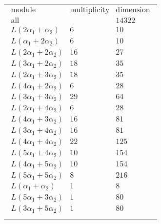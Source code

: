 \documentclass[crop,border=2mm]{standalone}
\begin{document}
\begin{tabular}{l}
$\displaystyle
\begin{array}{rll}
	\text{module}&\text{multiplicity}&\text{dimension} \\ \hline \text{all}&&14322 \\
	L\left( 2\alpha_{1}+\alpha_{2}\right)&6&10\\
	L\left(\alpha_{1}+ 2\alpha_{2}\right)&6&10\\
	L\left( 2\alpha_{1}+ 2\alpha_{2}\right)&16&27\\
	L\left( 3\alpha_{1}+ 2\alpha_{2}\right)&18&35\\
	L\left( 2\alpha_{1}+ 3\alpha_{2}\right)&18&35\\
	L\left( 4\alpha_{1}+ 2\alpha_{2}\right)&6&28\\
	L\left( 3\alpha_{1}+ 3\alpha_{2}\right)&29&64\\
	L\left( 2\alpha_{1}+ 4\alpha_{2}\right)&6&28\\
	L\left( 4\alpha_{1}+ 3\alpha_{2}\right)&16&81\\
	L\left( 3\alpha_{1}+ 4\alpha_{2}\right)&16&81\\
	L\left( 4\alpha_{1}+ 4\alpha_{2}\right)&22&125\\
	L\left( 5\alpha_{1}+ 4\alpha_{2}\right)&10&154\\
	L\left( 4\alpha_{1}+ 5\alpha_{2}\right)&10&154\\
	L\left( 5\alpha_{1}+ 5\alpha_{2}\right)&8&216\\
	L\left(\alpha_{1}+\alpha_{2}\right)&1&8\\
	L\left( 5\alpha_{1}+ 3\alpha_{2}\right)&1&80\\
	L\left( 3\alpha_{1}+ 5\alpha_{2}\right)&1&80
\end{array}
$ \\ \\

\end{tabular}
\end{document}
